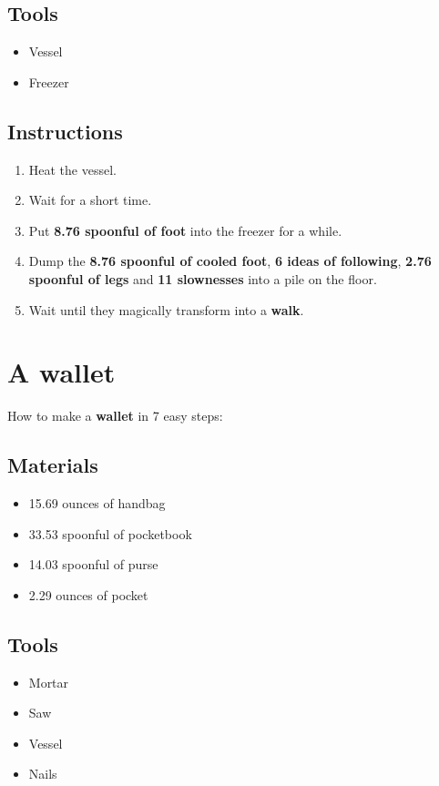 \documentclass{article}
\begin{document}
\subsection{Tools}\begin{itemize}
\item 
Vessel
\item 
Freezer
\end{itemize}
\subsection{Instructions}\begin{enumerate}
\item 
Heat the vessel.
\item 
Wait for a short time.
\item 
Put \textbf{8.76 spoonful of foot} into the freezer for a while.
\item 
Dump the \textbf{8.76 spoonful of cooled foot}, \textbf{6 ideas of following}, \textbf{2.76 spoonful of legs} and \textbf{11 slownesses} into a pile on the floor.
\item 
Wait until they magically transform into a \textbf{walk}.
\end{enumerate}
\newpage
\section{A wallet}How to make a \textbf{wallet} in 7 easy steps:

\subsection{Materials}\begin{itemize}
\item 
15.69 ounces of handbag
\item 
33.53 spoonful of pocketbook
\item 
14.03 spoonful of purse
\item 
2.29 ounces of pocket
\end{itemize}
\subsection{Tools}\begin{itemize}
\item 
Mortar
\item 
Saw
\item 
Vessel
\item 
Nails
\end{itemize}
\end{document}
